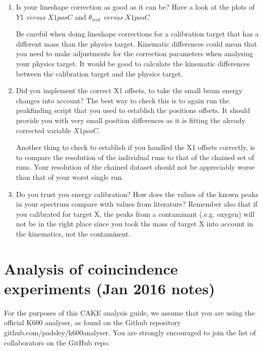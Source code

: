 \documentclass[11pt]{report}
\begin{document}
\begin{enumerate}
\item
Is your lineshape correction as good as it can be? 
Have a look at the plots of $Y1$ {\it versus} $X1posC$ and $\theta_{scat}$ {\it versus} $X1posC$

Be careful when doing lineshape
corrections for a calibration target that has a different mass than the physics target.
Kinematic differences could mean that you need to make adjustments for 
the correction parameters when analysing your physics target.
It would be good to calculate the kinematic differences between the calibration target and
the physics target. 

\item 
Did you implement the correct X1 offsets, to take the small beam energy changes into account?
The best way to check this is to again run the peakfinding script that you used to establish
the positions offsets. It should provide you with very small position differences as it is
fitting the already corrected variable $X1posC$.

Another thing to check to establish if you handled the X1 offsets correctly, is to compare
the resolution of the individual runs to that of the chained set of runs. Your resolution
of the chained dataset should not be appreciably worse than that of your worst single run.

\item
Do you trust you energy calibration? How does the values of the known peaks in your
spectrum compare with values from literature?
Remember also that if you calibrated for target X, the peaks from a contaminant (.e.g. oxygen)
will not be in the right place since you took ths mass of target X into account in the
kinematics, not the contaminent. 



\end{enumerate}



\section{Analysis of coincindence experiments (Jan 2016 notes)}\label{sec:analysiscoincidence}


For the purposes of this CAKE analysis guide, we assume that you are using the official K600 analyser, as found on the Github repository github.com/padsley/k600analyser. You are strongly encouraged to join the list of collaborators on the GitHub repo.
\end{document}
